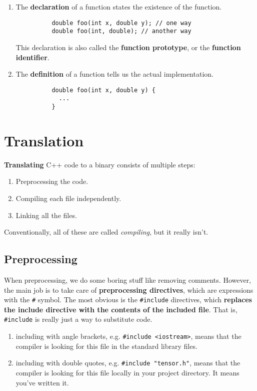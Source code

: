 \documentclass{article}
\begin{document}
  \begin{definition}[Functions]
    \begin{enumerate}
      \item The \textbf{declaration} of a function states the existence of the function. 
        \begin{lstlisting}
          double foo(int x, double y); // one way 
          double foo(int, double); // another way 
        \end{lstlisting}
        This declaration is also called the \textbf{function prototype}, or the \textbf{function identifier}. 

      \item The \textbf{definition} of a function tells us the actual implementation. 
        \begin{lstlisting}
          double foo(int x, double y) {
            ...
          }
        \end{lstlisting}
    \end{enumerate}
  \end{definition}

\section{Translation} 

    \textbf{Translating} C++ code to a binary consists of multiple steps: 
    \begin{enumerate}
      \item Preprocessing the code. 
      \item Compiling each file independently. 
      \item Linking all the files. 
    \end{enumerate}
    Conventionally, all of these are called \textit{compiling}, but it really isn't. 

  \subsection{Preprocessing} 

    When preprocessing, we do some boring stuff like removing comments. However, the main job is to take care of \textbf{preprocessing directives}, which are expressions with the \texttt{\#} symbol. The most obvious is the \texttt{\#include} directives, which \textbf{replaces the include directive with the contents of the included file}. That is, \texttt{\#include} is really just a way to substitute code.  
    \begin{enumerate}
      \item including with angle brackets, e.g. \texttt{\#include <iostream>}, means that the compiler is looking for this file in the standard library files. 
      \item including with double quotes, e.g. \texttt{\#include "tensor.h"}, means that the compiler is looking for this file locally in your project directory. It means you've written it. 
    \end{enumerate}
    
\end{document}
